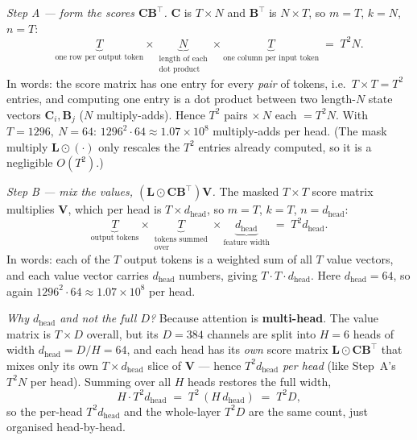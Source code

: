 \documentclass[11pt,a4paper]{article}
\begin{document}
\medskip
\noindent\emph{Step A --- form the scores $\bm{C}\bm{B}^\top$.}
$\bm{C}$ is $T\times N$ and $\bm{B}^\top$ is $N\times T$, so
$m=T$, $k=N$, $n=T$:
\begin{equation*}
  \underbrace{T}_{\text{one row per output token}}\!\times\!
  \underbrace{N}_{\substack{\text{length of each}\\\text{dot product}}}\!\times\!
  \underbrace{T}_{\text{one column per input token}}
  \;=\; T^{2}N .
\end{equation*}
In words: the score matrix has one entry for every \emph{pair} of
tokens, i.e.\ $T\times T = T^{2}$ entries, and computing one entry is a
dot product between two length-$N$ state vectors $\bm{C}_i,\bm{B}_j$
($N$ multiply-adds). Hence $T^{2}$ pairs $\times\,N$ each $= T^{2}N$.
With $T=1296,\ N=64$: $1296^{2}\cdot 64 \approx 1.07\!\times\!10^{8}$
multiply-adds per head. (The mask multiply $\bm{L}\odot(\cdot)$ only
rescales the $T^{2}$ entries already computed, so it is a negligible
$O(T^{2})$.)

\medskip
\noindent\emph{Step B --- mix the values,
$(\bm{L}\odot\bm{C}\bm{B}^\top)\bm{V}$.}
The masked $T\times T$ score matrix multiplies $\bm{V}$, which per head
is $T\times d_{\text{head}}$, so $m=T$, $k=T$, $n=d_{\text{head}}$:
\begin{equation*}
  \underbrace{T}_{\text{output tokens}}\!\times\!
  \underbrace{T}_{\substack{\text{tokens summed}\\\text{over}}}\!\times\!
  \underbrace{d_{\text{head}}}_{\text{feature width}}
  \;=\; T^{2}d_{\text{head}} .
\end{equation*}
In words: each of the $T$ output tokens is a weighted sum of all $T$
value vectors, and each value vector carries $d_{\text{head}}$ numbers,
giving $T\cdot T\cdot d_{\text{head}}$. Here $d_{\text{head}}=64$, so
again $1296^{2}\cdot 64 \approx 1.07\!\times\!10^{8}$ per head.

\emph{Why $d_{\text{head}}$ and not the full $D$?} Because attention is
\textbf{multi-head}. The value matrix is $T\times D$ overall, but its $D=384$
channels are split into $H=6$ heads of width $d_{\text{head}}=D/H=64$, and each
head has its \emph{own} score matrix $\bm{L}\odot\bm{C}\bm{B}^\top$ that mixes
only its own $T\times d_{\text{head}}$ slice of $\bm{V}$ --- hence
$T^{2}d_{\text{head}}$ \emph{per head} (like Step~A's $T^{2}N$ per head). Summing
over all $H$ heads restores the full width,
\begin{equation*}
  H\cdot T^{2}d_{\text{head}} \;=\; T^{2}\,(H\,d_{\text{head}}) \;=\; T^{2}D ,
\end{equation*}
so the per-head $T^{2}d_{\text{head}}$ and the whole-layer $T^{2}D$ are the same
count, just organised head-by-head.
\end{document}
